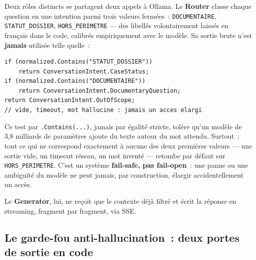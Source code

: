 \documentclass[12pt,a4paper]{article}
\newcommand{\code}[1]{\texttt{\small #1}}
\begin{document}
Deux r\^oles distincts se partagent deux appels \`a Ollama. Le \textbf{Router} classe chaque question en une intention parmi trois valeurs ferm\'ees~: \code{DOCUMENTAIRE}, \code{STATUT\_DOSSIER}, \code{HORS\_PERIMETRE} --- des libell\'es volontairement laiss\'es en fran\c{c}ais dans le code, calibr\'es empiriquement avec le mod\`ele. Sa sortie brute n'est \textbf{jamais} utilis\'ee telle quelle~:
\begin{center}\footnotesize
\begin{verbatim}
if (normalized.Contains("STATUT_DOSSIER"))
    return ConversationIntent.CaseStatus;
if (normalized.Contains("DOCUMENTAIRE"))
    return ConversationIntent.DocumentaryQuestion;
return ConversationIntent.OutOfScope;
// vide, timeout, mot hallucine : jamais un acces elargi
\end{verbatim}
\end{center}
Ce test par \code{.Contains(...)}, jamais par \'egalit\'e stricte, tol\`ere qu'un mod\`ele de 3,8 milliards de param\`etres ajoute du texte autour du mot attendu. Surtout~: tout ce qui ne correspond exactement \`a aucune des deux premi\`eres valeurs --- une sortie vide, un timeout r\'eseau, un mot invent\'e --- retombe par d\'efaut sur \code{HORS\_PERIMETRE}. C'est un syst\`eme \textbf{fail-safe, pas fail-open}~: une panne ou une ambigu\"it\'e du mod\`ele ne peut jamais, par construction, \'elargir accidentellement un acc\`es.

Le \textbf{Generator}, lui, ne re\c{c}oit que le contexte d\'ej\`a filtr\'e et \'ecrit la r\'eponse en streaming, fragment par fragment, via SSE.

\subsection{Le garde-fou anti-hallucination~: deux portes de sortie en code}
\end{document}

